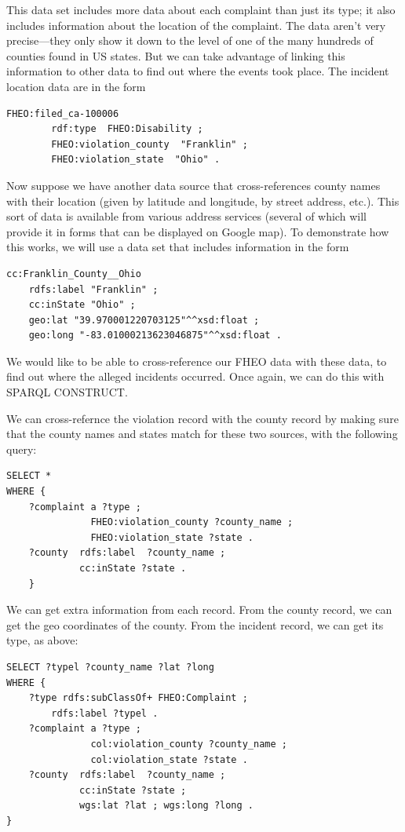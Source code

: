 This data set includes more data about each complaint than just its
type; it also includes information about the location of the complaint.
The data aren't very precise---they only show it down to the level
of one of the many hundreds of counties found in US states. But we can
take advantage of linking this information to other data to find out
where the events took place. The incident location data are in the form

\begin{lstlisting}
FHEO:filed_ca-100006
        rdf:type  FHEO:Disability ;
        FHEO:violation_county  "Franklin" ;
        FHEO:violation_state  "Ohio" .
\end{lstlisting}

Now suppose we have another data source that cross-references county names
with their location (given by latitude and longitude, by street address,
etc.). This sort of data is available from various address services
(several of which will provide it in forms that can be displayed on
Google map). To demonstrate how this works, we will use a data set
that  includes information in the form

\begin{lstlisting}
cc:Franklin_County__Ohio	
    rdfs:label "Franklin" ;
    cc:inState "Ohio" ;
	geo:lat "39.970001220703125"^^xsd:float ;
	geo:long "-83.01000213623046875"^^xsd:float .
\end{lstlisting}

We would like to be able to cross-reference our FHEO data with these
data, to find out where the alleged incidents occurred. Once again, we
can do this with SPARQL CONSTRUCT.

We can cross-refernce the violation record with the county record by 
making sure that the county names and states match for these two sources, with the following
query:

\begin{lstlisting}
SELECT *
WHERE {
    ?complaint a ?type ;
               FHEO:violation_county ?county_name ;
               FHEO:violation_state ?state .
    ?county  rdfs:label  ?county_name ;
             cc:inState ?state .
    }
\end{lstlisting}

We can get extra information from each record.  From the county record, 
we can get the geo coordinates of the county.  From the incident record, we can get 
its type, as above:

\begin{lstlisting}
SELECT ?typel ?county_name ?lat ?long 
WHERE {    
    ?type rdfs:subClassOf+ FHEO:Complaint ;
        rdfs:label ?typel .
    ?complaint a ?type ;
               col:violation_county ?county_name ;
               col:violation_state ?state .
    ?county  rdfs:label  ?county_name ;
             cc:inState ?state ;
             wgs:lat ?lat ; wgs:long ?long .
}
\end{lstlisting}

